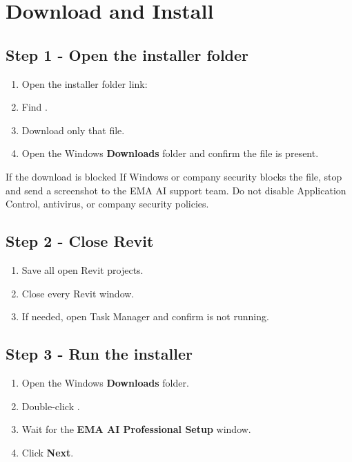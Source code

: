 \section{Download and Install}
\subsection*{Step 1 - Open the installer folder}
\begin{enumerate}
  \item Open the installer folder link: 
  \item Find .
  \item Download only that file.
  \item Open the Windows \textbf{Downloads} folder and confirm the file is present.
\end{enumerate}

\begin{warnbox}{If the download is blocked}
If Windows or company security blocks the file, stop and send a screenshot to the EMA AI support team. Do not disable Application Control, antivirus, or company security policies.
\end{warnbox}

\subsection*{Step 2 - Close Revit}
\begin{enumerate}
  \item Save all open Revit projects.
  \item Close every Revit window.
  \item If needed, open Task Manager and confirm  is not running.
\end{enumerate}

\subsection*{Step 3 - Run the installer}
\begin{enumerate}
  \item Open the Windows \textbf{Downloads} folder.
  \item Double-click .
  \item Wait for the \textbf{EMA AI Professional Setup} window.
  \item Click \textbf{Next}.
\end{enumerate}

